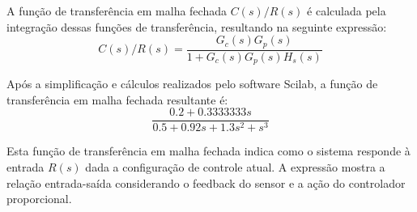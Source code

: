 A função de transferência em malha fechada \(C(s)/R(s)\) é calculada pela integração dessas funções de transferência, resultando na seguinte expressão:
\[
    C(s)/R(s) = \frac{G_c(s) G_p(s)}{1 + G_c(s) G_p(s) H_s(s)}
\]

Após a simplificação e cálculos realizados pelo software Scilab, a função de transferência em malha fechada resultante é:
\[
    \frac{0.2 + 0.3333333s}{0.5 + 0.92s + 1.3s^2 + s^3}
\]

Esta função de transferência em malha fechada indica como o sistema responde à entrada \(R(s)\) dada a configuração de controle atual. A expressão mostra a relação entrada-saída considerando o feedback do sensor e a ação do controlador proporcional.
